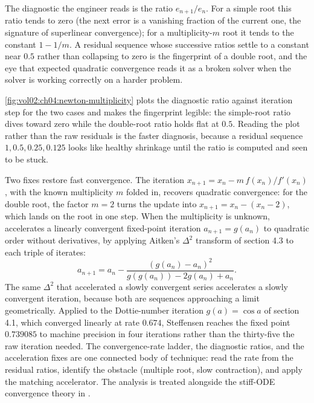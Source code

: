 The diagnostic the engineer reads is the ratio $e_{n+1}/e_{n}$. For a
simple root this ratio tends to zero (the next error is a vanishing
fraction of the current one, the signature of superlinear convergence);
for a multiplicity-$m$ root it tends to the constant $1 - 1/m$. A
residual sequence whose successive ratios settle to a constant near
$0.5$ rather than collapsing to zero is the fingerprint of a double
root, and the eye that expected quadratic convergence reads it as a
broken solver when the solver is working correctly on a harder problem.



\autoref{fig:vol02:ch04:newton-multiplicity} plots the diagnostic ratio
against iteration step for the two cases and makes the fingerprint
legible: the simple-root ratio dives toward zero while the double-root
ratio holds flat at $0.5$. Reading the plot rather than the raw
residuals is the faster diagnosis, because a residual sequence
$1, 0.5, 0.25, 0.125$ looks like healthy shrinkage until the ratio is
computed and seen to be stuck.

Two fixes restore fast convergence. The 
iteration $x_{n+1} = x_{n} - m \, f(x_{n})/f'(x_{n})$, with the known
multiplicity $m$ folded in, recovers quadratic convergence: for the
double root, the factor $m = 2$ turns the update into $x_{n+1} = x_{n}
- (x_{n} - 2)$, which lands on the root in one step. When the
multiplicity is unknown,  accelerates a
linearly convergent fixed-point iteration $a_{n+1} = g(a_{n})$ to
quadratic order without derivatives, by applying Aitken's $\Delta^{2}$
transform of section 4.3 to each triple of iterates:
\[
a_{n+1} = a_{n} - \frac{(g(a_{n}) - a_{n})^{2}}{g(g(a_{n})) - 2 g(a_{n})
+ a_{n}}.
\]
The same $\Delta^{2}$ that accelerated a slowly convergent series
accelerates a slowly convergent iteration, because both are sequences
approaching a limit geometrically. Applied to the Dottie-number
iteration $g(a) = \cos a$ of section 4.1, which converged linearly at
rate $0.674$, Steffensen reaches the fixed point $0.739085$ to
machine precision in four iterations rather than the thirty-five the
raw iteration needed. The convergence-rate ladder, the diagnostic
ratios, and the acceleration fixes are one connected body of technique:
read the rate from the residual ratios, identify the obstacle (multiple
root, slow contraction), and apply the matching accelerator. The
analysis is treated alongside the stiff-ODE convergence theory in
\cite{text:v2ch04-hairer-wanner-2008}.


